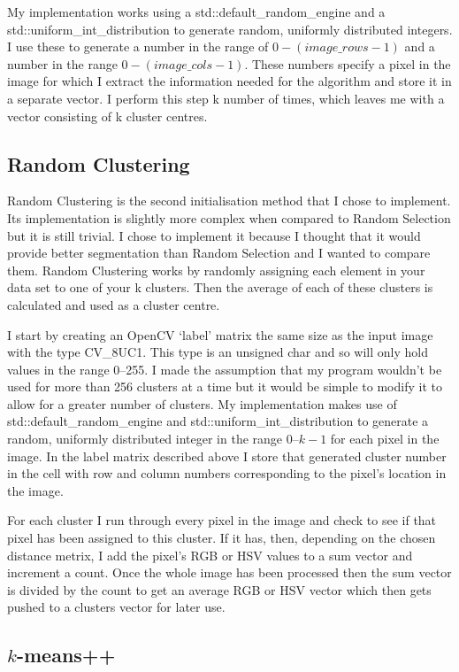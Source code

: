 \documentclass{article}
\begin{document}
My implementation works using a std::default\_random\_engine and a std::uniform\_int\_distribution to generate random, uniformly distributed integers. I use these to generate a number in the range of $0-(image\_rows-1)$ and a number in the range $0-(image\_cols-1)$. These numbers specify a pixel in the image for which I extract the information needed for the algorithm and store it in a separate vector. I perform this step k number of times, which leaves me with a vector consisting of k cluster centres.

\subsection{Random Clustering}

Random Clustering is the second initialisation method that I chose to implement. Its implementation is slightly more complex when compared to Random Selection but it is still trivial. I chose to implement it because I thought that it would provide better segmentation than Random Selection and I wanted to compare them. Random Clustering works by randomly assigning each element in your data set to one of your k clusters. Then the average of each of these clusters is calculated and used as a cluster centre. 

I start by creating an OpenCV `label' matrix the same size as the input image with the type CV\_8UC1. This type is an unsigned char and so will only hold values in the range 0--255. I made the assumption that my program wouldn't be used for more than 256 clusters at a time but it would be simple to modify it to allow for a greater number of clusters.  My implementation makes use of std::default\_random\_engine and std::uniform\_int\_distribution to generate a random, uniformly distributed integer in the range 0--$k-1$ for each pixel in the image. In the label matrix described above I store that generated cluster number in the cell with row and column numbers corresponding to the pixel's location in the image.

For each cluster I run through every pixel in the image and check to see if that pixel has been assigned to this cluster. If it has, then, depending on the chosen distance metrix, I add the pixel's RGB or HSV values to a sum vector and increment a count. Once the whole image has been processed then the sum vector is divided by the count to get an average RGB or HSV vector which then gets pushed to a clusters vector for later use.

\subsection{$k$-means++}
\end{document}
